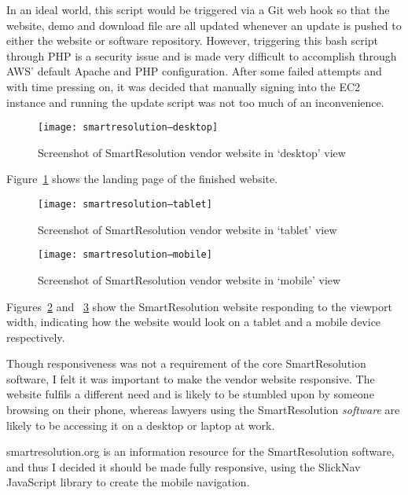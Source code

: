 In an ideal world, this script would be triggered via a Git web hook so that the website, demo and download file are all updated whenever an update is pushed to either the website or software repository. However, triggering this bash script through PHP is a security issue and is made very difficult to accomplish through AWS' default Apache and PHP configuration. After some failed attempts and with time pressing on, it was decided that manually signing into the EC2 instance and running the update script was not too much of an inconvenience.

\begin{figure}[h!]
  \centering
    \ifimages
    \texttt{[image: smartresolution--desktop]}
    \fi
  \caption{Screenshot of SmartResolution vendor website in `desktop' view}
  \label{screenshot:smartresolutionOrg:desktop}
\end{figure}

Figure~\ref{screenshot:smartresolutionOrg:desktop} shows the landing page of the finished website.

\begin{figure}[h!]
  \centering
    \ifimages
    \texttt{[image: smartresolution--tablet]}
    \fi
  \caption{Screenshot of SmartResolution vendor website in `tablet' view}
  \label{screenshot:smartresolutionOrg:tablet}
\end{figure}

\begin{figure}[h!]
  \centering
    \ifimages
    \texttt{[image: smartresolution--mobile]}
    \fi
  \caption{Screenshot of SmartResolution vendor website in `mobile' view}
  \label{screenshot:smartresolutionOrg:mobile}
\end{figure}

Figures~\ref{screenshot:smartresolutionOrg:tablet} and ~\ref{screenshot:smartresolutionOrg:mobile} show the SmartResolution website responding to the viewport width, indicating how the website would look on a tablet and a mobile device respectively.

Though responsiveness was not a requirement of the core SmartResolution software, I felt it was important to make the vendor website responsive. The website fulfils a different need and is likely to be stumbled upon by someone browsing on their phone, whereas lawyers using the SmartResolution \emph{software} are likely to be accessing it on a desktop or laptop at work.

smartresolution.org is an information resource for the SmartResolution software, and thus I decided it should be made fully responsive, using the SlickNav JavaScript library to create the mobile navigation.

